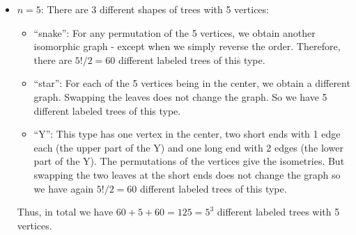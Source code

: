 \begin{example}
\begin{itemize}
\[\begin{tikzpicture}[every label/.style={font=\small}, scale=0.6]
  \begin{scope}[shift={(0,3*\dy)}]
    \node[dot] at (0,1) (A) {};
    \node[dot] at (1,1) (B) {};
    \node[dot] at (0,0) (C) {};
    \node[dot] at (1,0) (D) {};
    \draw (A)--(B) (A)--(C) (A)--(D);
  \end{scope}
  \begin{scope}[shift={(\dx,3*\dy)}]
    \node[dot] at (0,1) (A) {};
    \node[dot] at (1,1) (B) {};
    \node[dot] at (0,0) (C) {};
    \node[dot] at (1,0) (D) {};
    \draw (B)--(A) (B)--(C) (B)--(D);
  \end{scope}
  \begin{scope}[shift={(2*\dx,3*\dy)}]
    \node[dot] at (0,1) (A) {};
    \node[dot] at (1,1) (B) {};
    \node[dot] at (0,0) (C) {};
    \node[dot] at (1,0) (D) {};
    \draw (C)--(A) (C)--(B) (C)--(D);
  \end{scope}
  \begin{scope}[shift={(3*\dx,3*\dy)}]
    \node[dot] at (0,1) (A) {};
    \node[dot] at (1,1) (B) {};
    \node[dot] at (0,0) (C) {};
    \node[dot] at (1,0) (D) {};
    \draw (D)--(A) (D)--(B) (D)--(C);
  \end{scope}
\end{tikzpicture}
\]
We can group them into 2 sets: The ``snake'' type and the ``star'' type.
The first 12, the ``snakes'', are the same if we consider them unlabeled: They are isomorphic (Def.~\ref{def:isomorphism}). 
\item \(n=5\): There are 3 different shapes of trees with 5 vertices:
\begin{itemize}
\item ``snake'': For any permutation of the 5 vertices, we obtain another isomorphic graph - except when we simply reverse the order.
Therefore, there are \(5!/2=60\) different labeled trees of this type.
\item ``star'': For each of the 5 vertices being in the center, we obtain a different graph.
Swapping the leaves does not change the graph.
So we have 5 different labeled trees of this type.
\item ``Y'': This type has one vertex in the center, two short ends with 1 edge each (the upper part of the Y) and one long end with 2 edges (the lower part of the Y).
The permutations of the vertices give the isometries.
But swapping the two leaves at the short ends does not change the graph so we have again \(5!/2=60\) different labeled trees of this type.
\end{itemize}
Thus, in total we have \(60+5+60=125=5^{3}\) different labeled trees with 5 vertices.
\qedhere
\end{itemize}
\end{example}
